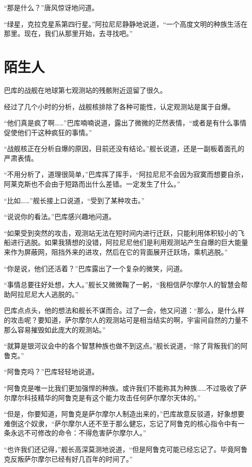 “那是什么？”唐风惊讶地问道。

“绿星，克拉克星系第四行星。”阿拉尼尼静静地说道，“一个高度文明的种族生活在那里。现在，我们从那里开始，去寻找吧。”

\chapter{陌生人}

巴库的战舰在地球第七观测站的残骸附近逗留了很久。

经过了几个小时的分析，战舰核排除了各种可能性，认定观测站是属于自爆。

“他们真是疯了啊……”巴库喃喃说道，露出了微微的茫然表情，“或者是有什么事情促使他们干这种疯狂的事情。”

“战舰核正在分析自爆的原因，目前还没有结论。”舰长说道，还是一副板着面孔的严肃表情。

“不用分析了，道理很简单，”巴库挥了挥手，“阿拉尼尼不会因为寂寞而想要自杀，阿莱克斯也不会由于短路而出什么差错。一定发生了什么。”

“比如……”舰长接上口说道，“受到了某种攻击。”

“说说你的看法。”巴库感兴趣地问道。

“如果受到突然的攻击，观测站无法在短时间内进行迁跃，只能利用体积较小的飞船进行逃脱。如果我猜想的没错，阿拉尼尼他们是利用观测站产生自爆的巨大能量来作为屏蔽网，阻挡外来的进攻，然后在它的背面展开迁跃场，乘机逃脱。”

“你是说，他们还活着？”巴库露出了一个复杂的微笑，问道。

“事情总要往好处想，大人。”舰长又微微鞠了一躬，“我相信萨尔摩尔人的智慧会帮助阿拉尼尼大人逃脱的。”

巴库点点头，他的想法和舰长不谋而合。过了一会，他又问道：“那么，是什么样的攻击呢？要知道，萨尔摩尔人的观测站可是相当结实的啊，宇宙间自然的力量不那么容易摧毁如此庞大的观测站。”

“就算是银河议会中的各个智慧种族也做不到这点。”舰长说道，“除了背叛我们的阿鲁克。”

“阿鲁克吗？”巴库轻轻地说道。

“阿鲁克是唯一比我们更加强悍的种族。或许我们不能称其为种族……不过吸收了萨尔摩尔科技精华的阿鲁克是有这个能力攻击任何萨尔摩尔天体的。”

“但是，你要知道，阿鲁克是萨尔摩尔人制造出来的，”巴库故意反驳道，好象想要难倒这个奴隶，“萨尔摩尔人还不至于那么健忘，忘记了阿鲁克的核心指令中有一条永远不可修改的命令：不得危害萨尔摩尔人。”

“也许我们还记得，”舰长高深莫测地说道，“但是阿鲁克可能已经忘记了。毕竟阿鲁克反叛萨尔摩尔已经有好几百年的时间了。”

